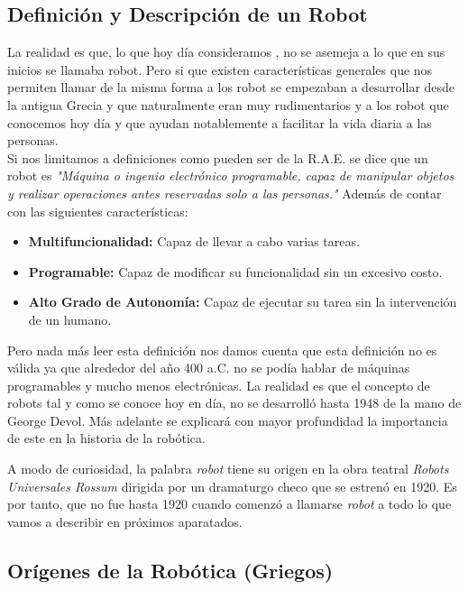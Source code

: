 



\subsection{Definición y Descripción de un Robot}


La realidad es que, lo que hoy día consideramos , no se asemeja a lo que en sus inicios se llamaba robot. Pero si que existen características generales que nos permiten llamar de la misma forma a los robot se empezaban a desarrollar desde la antigua Grecia y que naturalmente eran muy rudimentarios y a los robot que conocemos hoy día y que ayudan notablemente a facilitar la vida diaria a las personas.\\

Si nos limitamos a definiciones como pueden ser de la R.A.E. se dice que un robot es \textit{"Máquina o ingenio electrónico programable, capaz de manipular objetos y realizar operaciones antes reservadas solo a las personas."} Además de contar con las siguientes características:

\begin{itemize}
\item \textbf{Multifuncionalidad:} Capaz de llevar a cabo varias tareas.
\item \textbf{Programable:} Capaz de modificar su funcionalidad sin un excesivo costo.
\item \textbf{Alto Grado de Autonomía:} Capaz de ejecutar su tarea sin la intervención de un humano.
\end{itemize}

Pero nada más leer esta definición nos damos cuenta que esta definición no es válida ya que alrededor del año 400 a.C. no se podía hablar de máquinas programables y mucho menos electrónicas. La realidad es que el concepto de robots tal y como se conoce hoy en día, no se desarrolló hasta 1948 de la mano de George Devol. Más adelante se explicará con mayor profundidad la importancia de este en la historia de la robótica.

A modo de curiosidad, la palabra \textit{robot} tiene su origen en la obra teatral \textit{Robots Universales Rossum} dirigida por un dramaturgo checo que se estrenó en 1920. Es por tanto, que no fue hasta 1920 cuando comenzó a llamarse \textit{robot} a todo lo que vamos a describir en próximos aparatados.

\subsection{Orígenes de la Robótica (Griegos)}

